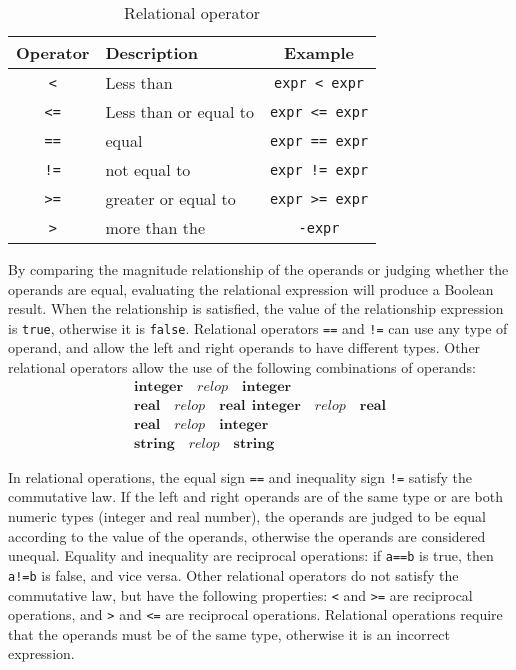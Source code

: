 \begin{table}[htb]
    \centering
    \setlength{\tabcolsep}{10mm}
    \begin{tabular}{clc} \toprule
        \textbf{Operator} & \textbf{Description} & \textbf{Example} \\ \midrule
        \texttt{<} & Less than & \texttt{expr < expr} \\
        \texttt{<=} & Less than or equal to & \texttt{expr <= expr} \\
        \texttt{==} & equal & \texttt{expr == expr} \\
        \texttt{!=} & not equal to & \texttt{expr != expr} \\
        \texttt{>=} & greater or equal to & \texttt{expr >= expr} \\
        \texttt{>} & more than the & \texttt{-expr} \\
        \bottomrule
    \end{tabular}
    \caption{Relational operator}
    \label{tab::relop_operator}
\end{table}By comparing the magnitude relationship of the operands or judging whether the operands are equal, evaluating the relational expression will produce a Boolean result. When the relationship is satisfied, the value of the relationship expression is \texttt{true}, otherwise it is \texttt{false}. Relational operators \texttt{==} and \texttt{!=} can use any type of operand, and allow the left and right operands to have different types. Other relational operators allow the use of the following combinations of operands: \vspace{-0.5em}
\begin{gather*}
    \bm{integer} \quad relop \quad \bm{integer} \\
    \bm{real} \quad relop \quad \bm{real} \ \
    \bm{integer} \quad relop \quad \bm{real} \\
    \bm{real} \quad relop \quad \bm{integer} \\
    \bm{string} \quad relop \quad \bm{string}
\end{gather*}

In relational operations, the equal sign \texttt{==} and inequality sign \texttt{!=} satisfy the commutative law. If the left and right operands are of the same type or are both numeric types (integer and real number), the operands are judged to be equal according to the value of the operands, otherwise the operands are considered unequal. Equality and inequality are reciprocal operations: if \texttt{a==b} is true, then \texttt{a!=b} is false, and vice versa. Other relational operators do not satisfy the commutative law, but have the following properties: \texttt{<} and \texttt{>=} are reciprocal operations, and \texttt{>} and \texttt{<=} are reciprocal operations. Relational operations require that the operands must be of the same type, otherwise it is an incorrect expression.

